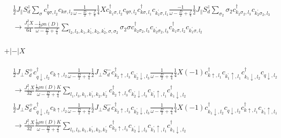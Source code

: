 \documentclass[12pt]{revtex4-2}
\begin{document}
\begin{equation}\begin{aligned}
	&\frac{1}{2}J_\parallel S_d^z \sum_\sigma c^\dagger_{q \sigma, l_2}c_{k \sigma, l_2} \frac{1}{\omega - \frac{D}{2} + \frac{J}{4}} \frac{1}{4}X c^\dagger_{k_1\sigma,l_2}c_{q\sigma,l_2} c^\dagger_{k\sigma,l_1}c_{k_1^\prime\sigma,l_1}\frac{-1}{\omega - \frac{D}{2} + \frac{J}{4}}\frac{1}{2}J_\parallel S_d^z \sum_{\sigma_2} \sigma_2 c^\dagger_{k_2 \sigma_2, l_3}c_{k_2^\prime \sigma_2, l_3}\\
	&\longrightarrow \frac{J_\parallel^2 X}{64} \frac{-\frac{1}{2}\rho n(D)}{\omega - \frac{D}{2} + \frac{J}{4}}\sum_{l_2, l_3, k_1,k_1^\prime,k_2,k_2^\prime,\sigma,\sigma_2} \sigma_2 \sigma c^\dagger_{k_2 \sigma_2, l_3}c_{k_2^\prime \sigma_2, l_3} c^\dagger_{k_1\sigma,l_2}c_{k_1^\prime\sigma,l_2}
\end{aligned}\end{equation}

\paragraph{\(+|-|X\)}
\begin{equation}\begin{aligned}
	&\frac{1}{2}J_\perp S_d^+ c^\dagger_{q \downarrow, l_2}c_{k \uparrow, l_2} \frac{1}{\omega - \frac{D}{2} + \frac{J}{4}}\frac{1}{2}J_\perp S_d^- c^\dagger_{k_2 \uparrow, l_3}c_{k_2^\prime \downarrow, l_3} \frac{1}{\omega - \frac{D}{2} + \frac{J}{4}} \frac{1}{4}X \left( -1 \right) c^\dagger_{k\uparrow,l_1}c_{k_1^\prime\uparrow,l_1}c^\dagger_{k_1 \downarrow,l_2}c_{q \downarrow,l_2} \\
	&\longrightarrow \frac{J_\perp^2 X}{32} \frac{\frac{1}{2}\rho n(D) K}{\omega - \frac{D}{2} + \frac{J}{4}}\sum_{l_1, l_3, k_1, k_1^\prime,k_2,k_2^\prime} c^\dagger_{k_2 \uparrow, l_3}c_{k_2^\prime \downarrow, l_3}c_{k_1^\prime\uparrow,l_1}c^\dagger_{k_1 \downarrow,l_2}
\end{aligned}\end{equation}
\begin{equation}\begin{aligned}
	&\frac{1}{2}J_\perp S_d^+ c^\dagger_{q \downarrow, l_2}c_{k \uparrow, l_2} \frac{1}{\omega - \frac{D}{2} + \frac{J}{4}}\frac{1}{2}J_\perp S_d^- c^\dagger_{k_2 \uparrow, l_3}c_{k_2^\prime \downarrow, l_3} \frac{1}{\omega - \frac{D}{2} + \frac{J}{4}} \frac{1}{4}X \left( -1 \right) c^\dagger_{k_1 \downarrow,l_2}c_{q \downarrow,l_2} c^\dagger_{k\uparrow,l_1}c_{k_1^\prime\uparrow,l_1} \\
	&\longrightarrow \frac{J_\perp^2 X}{32} \frac{\frac{1}{2}\rho n(D) K}{\omega - \frac{D}{2} + \frac{J}{4}}\sum_{l_1, l_3, k_1, k_1^\prime,k_2,k_2^\prime} c^\dagger_{k_2 \uparrow, l_3}c_{k_2^\prime \downarrow, l_3}c_{k_1^\prime\uparrow,l_1}c^\dagger_{k_1 \downarrow,l_2}
\end{aligned}\end{equation}
\end{document}
